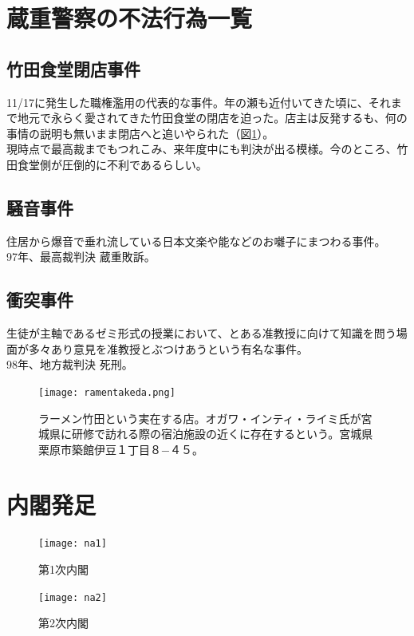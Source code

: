 \newpage
\section{蔵重警察の不法行為一覧}
\subsection{竹田食堂閉店事件}
11/17に発生した職権濫用の代表的な事件。年の瀬も近付いてきた頃に、それまで地元で永らく愛されてきた竹田食堂の閉店を迫った。店主は反発するも、何の事情の説明も無いまま閉店へと追いやられた（図\ref{ramentakeda}）。\\
現時点で最高裁までもつれこみ、来年度中にも判決が出る模様。今のところ、竹田食堂側が圧倒的に不利であるらしい。
\subsection{騒音事件}
住居から爆音で垂れ流している日本文楽や能などのお囃子にまつわる事件。\\
97年、最高裁判決 蔵重敗訴。

\subsection{衝突事件}
生徒が主軸であるゼミ形式の授業において、とある准教授に向けて知識を問う場面が多々あり意見を准教授とぶつけあうという有名な事件。\\
98年、地方裁判決 死刑。

\begin{figure}[H]
\centering
\texttt{[image: ramentakeda.png]}
\caption{ラーメン竹田という実在する店。オガワ・インティ・ライミ氏が宮城県に研修で訪れる際の宿泊施設の近くに存在するという。宮城県栗原市築館伊豆１丁目８−４５。}
\label{ramentakeda}
\end{figure}


\newpage
\section{内閣発足}

\begin{figure}[H]
\centering
\texttt{[image: na1]}
\caption{第1次内閣}
\label{na1}
\end{figure}

\begin{figure}[H]
\centering
\texttt{[image: na2]}
\caption{第2次内閣}
\label{na2}
\end{figure}

